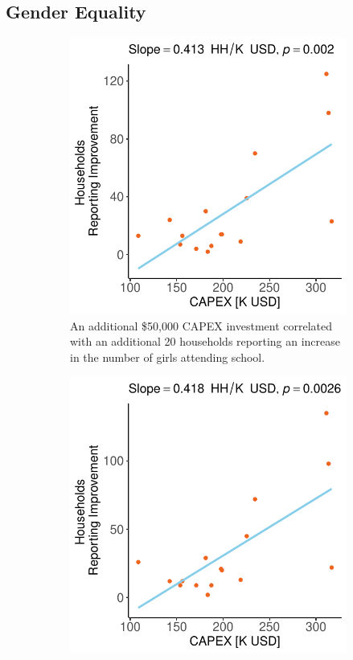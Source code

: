 \subsection{Gender Equality}
\begin{figure}[b]
	\centering
	\begin{subfigure}[t]{0.48\textwidth}
		\centering
		\includegraphics[width=\textwidth]{images/girls_schooling_change_regression_community.pdf}
		\caption{An additional \$50,000 CAPEX investment correlated with an additional 20 households reporting an increase in the number of girls attending school.}
		\label{fig:girls-school}
	\end{subfigure}
	\hfill
	\begin{subfigure}[t]{0.48\textwidth}
		\centering
		\includegraphics[width=\textwidth]{images/boys_schooling_change_regression_community.pdf}

\end{subfigure}
\end{figure}
